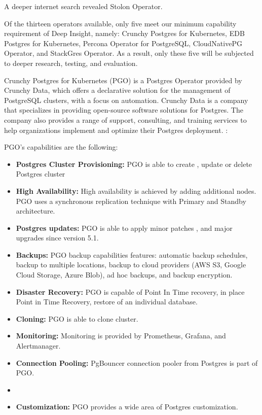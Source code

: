 A deeper internet search revealed Stolon Operator. \cite{PalarkComparingKubernetes}

Of the thirteen operators available, only five meet our minimum capability requirement of Deep Insight, namely: Crunchy Postgres for Kubernetes, EDB Postgres for Kubernetes, Percona Operator for PostgreSQL, CloudNativePG Operator, and StackGres Operator. As a result, only these five will be subjected to deeper research, testing, and evaluation.

\pagebreak
{}
Crunchy Postgres for Kubernetes (PGO) is a Postgres Operator provided by Crunchy Data, which offers a declarative solution for the management of PostgreSQL clusters, with a focus on automation.
Crunchy Data is a company that specializes in providing open-source software solutions for Postgres. The company also provides a range of support, consulting, and training services to help organizations implement and optimize their Postgres deployment. \cite{Crunchy}:

PGO’s capabilities are the following:
\begin{itemize}
  \item \textbf{Postgres Cluster Provisioning:} PGO is able to create \cite{CrunchyDocCreate}, update \cite{CrunchyDocUpdate} or delete Postgres cluster \cite{CrunchyDocDelete}
  \item \textbf{High Availability:} High availability is achieved by adding additional nodes. PGO uses a synchronous replication technique with Primary and Standby architecture. \cite{CrunchyDocHA}
  \item \textbf{Postgres updates:} PGO is able to apply minor patches \cite{CrunchyDocMinorUpdates}, and major upgrades since version 5.1. \cite{CrunchyBlogUpdates}
  \item \textbf{Backups:} PGO backup capabilities features: automatic backup schedules, backup to multiple locations, backup to cloud providers (AWS S3, Google Cloud Storage, Azure Blob), ad hoc backups, and backup encryption. \cite{CrunchyDocBackups}
  \item \textbf{Disaster Recovery:} PGO is capable of Point In Time recovery, in place Point in Time Recovery, restore of an individual database. \cite{CrunchyDocDisasterRecovery}
  \item \textbf{Cloning:} PGO is able to clone cluster. \cite{CrunchyDocDisasterRecovery}
  \item \textbf{Monitoring:} Monitoring is provided by Prometheus, Grafana, and Alertmanager. \cite{CrunchyDocMonitoring}
  \item \textbf{Connection Pooling:} PgBouncer connection pooler from Postgres is part of PGO. \cite{CrunchyDocConnectionPooling}
  \item   \item \textbf{Customization:} PGO provides a wide area of Postgres customization. \cite{CrunchyDocCustomisation}
\end{itemize}

